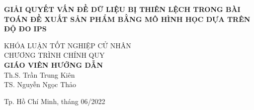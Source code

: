 \begin{titlepage}
\begin{center}

{ \Large \bfseries GIẢI QUYẾT VẤN ĐỀ DỮ LIỆU BỊ THIÊN LỆCH TRONG BÀI TOÁN ĐỀ XUẤT SẢN PHẨM BẰNG MÔ HÌNH HỌC DỰA TRÊN ĐỘ ĐO IPS \\[2cm]}  


\large KHÓA LUẬN TỐT NGHIỆP CỬ NHÂN\\
\large CHƯƠNG TRÌNH CHÍNH QUY\\[2cm]

\textbf{GIÁO VIÊN HƯỚNG DẪN}\\
Th.S. Trần Trung Kiên\\
TS. Nguyễn Ngọc Thảo\\



\vfill
Tp. Hồ Chí Minh, tháng 06/2022

\end{center}
\end{titlepage}